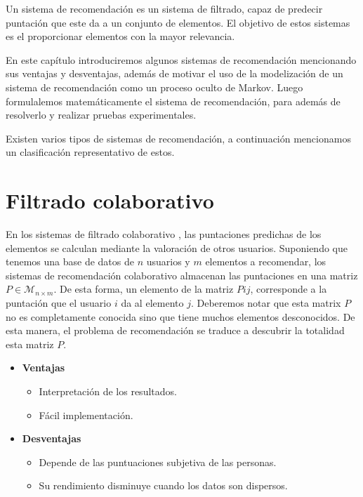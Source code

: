 
% 
Un sistema de recomendación es un sistema de filtrado, capaz de predecir puntación que este da a un conjunto de elementos. El objetivo de estos sistemas es el proporcionar elementos con la mayor relevancia. 

En este capítulo introduciremos algunos sistemas de recomendación mencionando sus ventajas y desventajas, además de motivar el uso de la modelización de un sistema de recomendación como un proceso oculto de Markov. Luego formulalemos matemáticamente el sistema de recomendación, para además de resolverlo y realizar pruebas experimentales.


Existen varios tipos de sistemas de recomendación, a continuación mencionamos un clasificación representativo de estos.

\section{Filtrado colaborativo} 

En los sistemas de filtrado colaborativo \cite{schafer2007collaborative}, las puntaciones predichas de los elementos se calculan mediante la valoración de otros usuarios.  Suponiendo que tenemos una base de datos de $n$ usuarios y $m$ elementos a recomendar, los sistemas de recomendación colaborativo almacenan las puntaciones en una matriz $P \in \mathcal{M}_{n\times m}$. De esta forma, un elemento de la matriz $P{ij}$, corresponde a la puntación que el usuario $i$ da al elemento $j$. Deberemos notar que esta matrix $P$ no es completamente conocida sino que tiene muchos elementos desconocidos.  De esta manera, el problema de recomendación se traduce a descubrir la totalidad esta matriz $P$.
 
    \begin{itemize}
        \item \textbf{Ventajas}
        \begin{itemize}
            \item Interpretación de los resultados.
            \item Fácil implementación.
        \end{itemize} 

         \item \textbf{Desventajas} 
         \begin{itemize}
             \item Depende de las puntuaciones subjetiva de las personas.
             \item Su rendimiento disminuye cuando los datos son dispersos.
         \end{itemize}
    \end{itemize}

